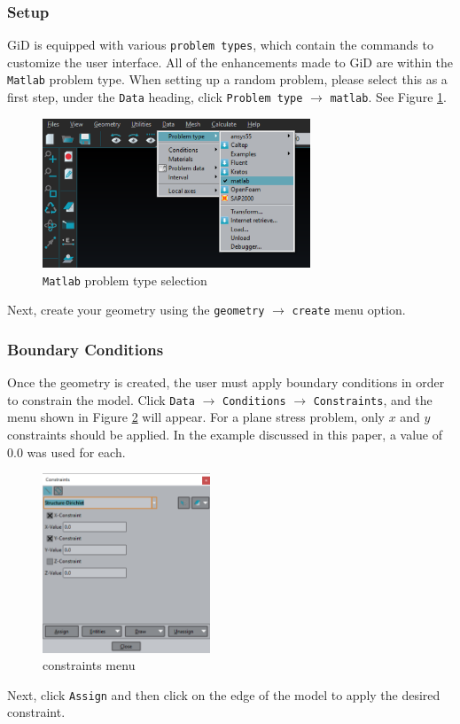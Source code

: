 \subsubsection{Setup}
GiD is equipped with various \texttt{problem types}, which contain the commands to customize the user interface. All of the enhancements made to GiD are within the \texttt{Matlab} problem type. When setting up a random problem, please select this as a first step, under the \texttt{Data} heading, click \texttt{Problem type} $\rightarrow$ \texttt{matlab}. See Figure \ref{fig:Matlabproblemtype}.\\
\begin{figure}[ht]
  \centering
  \includegraphics[width=80mm]{images/GiD_probtype.png}
  \caption{\texttt{Matlab} problem type selection}
  \label{fig:Matlabproblemtype}
\end{figure}
Next, create your geometry using the \texttt{geometry} $\rightarrow$ \texttt{create} menu option.

\subsubsection{Boundary Conditions}
Once the geometry is created, the user must apply boundary conditions in order to constrain the model. Click \texttt{Data} $\rightarrow$ \texttt{Conditions} $\rightarrow$ \texttt{Constraints}, and the menu shown in Figure \ref{fig:GiDConstraints} will appear. For a plane stress problem, only $x$ and $y$ constraints should be applied. In the example discussed in this paper, a value of 0.0 was used for each.\\[3pt]
\begin{figure}[ht]
  \centering
  \includegraphics[width=50mm]{images/GiD_constraints.png}
  \caption{constraints menu}
  \label{fig:GiDConstraints}
\end{figure}
Next, click \texttt{Assign} and then click on the edge of the model to apply the desired constraint.

